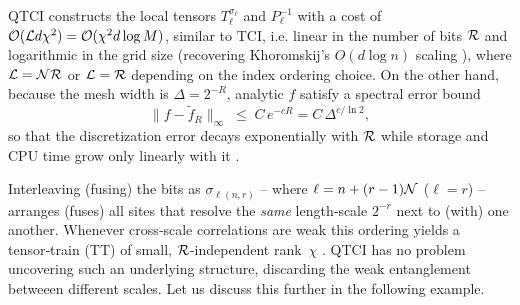 QTCI constructs the local tensors \(T^{\sigma_\ell}_\ell\) and \(P^{-1}_\ell\) with a cost of \(\mathcal{O}(\mathcal{L} d\chi^{2}) = \mathcal{O}( \chi^2 d \log M)\), similar to TCI, i.e. linear in the number of bits $\mathcal{R}$ and logarithmic in the grid size (recovering Khoromskij’s \(O(d\log n)\) scaling \cite{Khoromskij2011}), where $\mathcal{L} = \mathcal{N} \mathcal{R}$ or $\mathcal{L} = \mathcal{R}$ depending on the index ordering choice. On the other hand, because the mesh width is \(\Delta=2^{-R}\), analytic \(f\) satisfy a spectral
error bound
\begin{equation}
	\|f-\tilde f_R\|_\infty\;\le\;C\,e^{-cR}=C\,\Delta^{c/\ln 2},
\end{equation}
so that the discretization error decays exponentially with $\mathcal{R}$ while storage and CPU time grow only linearly with it \cite{Khoromskij2011, Lindsey2024}.

Interleaving (fusing) the bits as \(\sigma_{\ell(n,r)}\) -- where $\ell = n + (r-1)\mathcal{N}$ ($\ell = r$) -- arranges (fuses) all sites that resolve the \emph{same} length‑scale \(2^{-r}\) next to (with) one another. Whenever cross‑scale correlations are weak this ordering yields a tensor‑train (TT) of small, \(\mathcal{R}\)-independent rank \(\chi\) \cite{Hiroshi2023, Khoromskij2011}. QTCI has no problem uncovering such an underlying structure, discarding the weak entanglement betweeen different scales. Let us discuss this further in the following example. 

